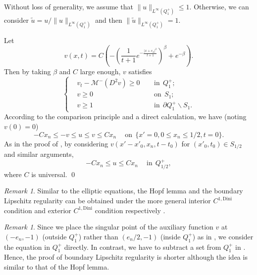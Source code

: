 \documentclass[preprint,12pt]{elsarticle}
\theoremstyle{definition}
\theoremstyle{remark}
\newtheorem{remark}[theorem]{Remark}
\numberwithin{equation}{section}
\begin{document}
\proof Without loss of generality, we assume that $\|u\|_{L^{\infty}(Q_1^+)}\leq 1$. Otherwise, we can consider $\tilde{u}=u/\|u\|_{L^{\infty}(Q_1^+)}$ and then $\|\tilde{u}\|_{L^{\infty}(Q_1^+)}=1$.

Let
\begin{equation*}
  v(x,t)=C\left(-\left(\frac{1}{t+1}e^{-\frac{|x+e_n|^2}{t+1}}\right)^{\beta}
+e^{-\beta}\right).
\end{equation*}
Then by taking $\beta$ and $C$ large enough, $v$ satisfies
\begin{equation}\label{e.Lip.v}
\left\{\begin{aligned}
&v_t-\mathcal{M}^-(D^2v)\geq 0&& ~~\mbox{in}~~Q^+_{1};\\
&v\geq 0&& ~~\mbox{on}~~S_{1};\\
&v\geq 1&&~~\mbox{in}~~\partial Q^+_{1}\backslash S_{1}.
\end{aligned}\right.
\end{equation}
According to the comparison principle and a direct calculation, we have (noting $v(0)=0$)
\begin{equation*}
-Cx_n\leq -v\leq u\leq v\leq Cx_n ~~~~\mbox{ on}~~\{x'=0,0\leq x_n\leq 1/2,t=0\}.
\end{equation*}
As in the proof of , by considering $v(x'-x'_0,x_n,t-t_0)$  for $(x'_0,t_0)\in S_{1/2}$ and similar arguments,
\begin{equation*}
-Cx_n\leq u\leq Cx_n ~~~~\mbox{ in}~~ Q^+_{1/2},
\end{equation*}
where $C$ is universal.
\qed~\\

\begin{remark}\label{Lip_re1}
Similar to the elliptic equations, the Hopf lemma and the boundary Lipschitz regularity can be obtained under the more general interior $C^{1,\mathrm{Dini}}$ condition and exterior $C^{1,\mathrm{Dini}}$ condition respectively \cite{lian2018boundary}.
\end{remark}

\begin{remark}\label{re2.2}
Since we place the singular point of the auxiliary function $v$ at $(-e_n,-1)$ (outside $Q_1^+$) rather than $(e_n/2,-1)$ (inside $Q_1^+$) as in , we consider the equation in $Q_1^+$ directly. In contrast, we have to subtract a set from $Q_1^+$ in . Hence, the proof of boundary Lipschitz regularity is shorter although the idea is similar to that of the Hopf lemma.
\end{remark}
~\\
\end{document}
